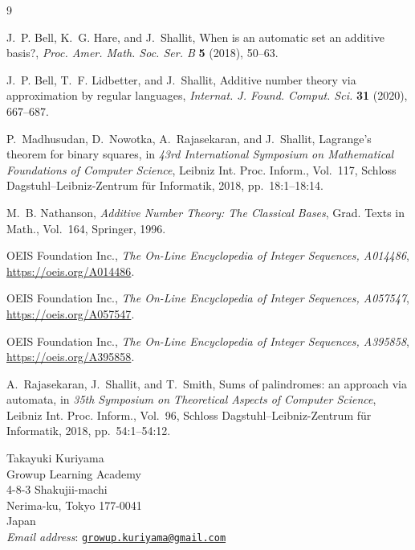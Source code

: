 \documentclass[12pt]{ltjsarticle}
\theoremstyle{plain}
\begin{document}
\begin{thebibliography}{9}

J.~P. Bell, K.~G. Hare, and J.~Shallit,
When is an automatic set an additive basis?,
\emph{Proc. Amer. Math. Soc. Ser. B} \textbf{5} (2018), 50--63.

J.~P. Bell, T.~F. Lidbetter, and J.~Shallit,
Additive number theory via approximation by regular languages,
\emph{Internat. J. Found. Comput. Sci.} \textbf{31} (2020), 667--687.

P.~Madhusudan, D.~Nowotka, A.~Rajasekaran, and J.~Shallit,
Lagrange's theorem for binary squares,
in \emph{43rd International Symposium on Mathematical Foundations of
Computer Science}, Leibniz Int. Proc. Inform., Vol.~117, Schloss
Dagstuhl--Leibniz-Zentrum f{\"u}r Informatik, 2018, pp.~18:1--18:14.

M.~B. Nathanson,
\emph{Additive Number Theory: The Classical Bases},
Grad. Texts in Math., Vol.~164, Springer, 1996.

OEIS Foundation Inc.,
\emph{The On-Line Encyclopedia of Integer Sequences, A014486},
\url{https://oeis.org/A014486}.

OEIS Foundation Inc.,
\emph{The On-Line Encyclopedia of Integer Sequences, A057547},
\url{https://oeis.org/A057547}.

OEIS Foundation Inc.,
\emph{The On-Line Encyclopedia of Integer Sequences, A395858},
\url{https://oeis.org/A395858}.

A.~Rajasekaran, J.~Shallit, and T.~Smith,
Sums of palindromes: an approach via automata,
in \emph{35th Symposium on Theoretical Aspects of Computer Science},
Leibniz Int. Proc. Inform., Vol.~96, Schloss Dagstuhl--Leibniz-Zentrum
f{\"u}r Informatik, 2018, pp.~54:1--54:12.

\end{thebibliography}

\begin{flushleft}
Takayuki Kuriyama\\
Growup Learning Academy\\
4-8-3 Shakujii-machi\\
Nerima-ku, Tokyo 177-0041\\
Japan\\
\textit{Email address}: \href{mailto:growup.kuriyama@gmail.com}
{\texttt{growup.kuriyama@gmail.com}}
\end{flushleft}
\end{document}
